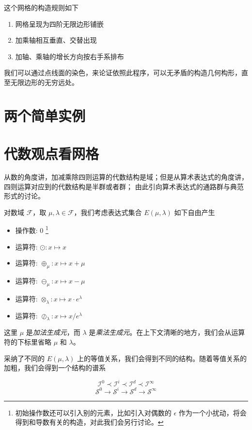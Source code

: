 \documentclass[a4paper,12pt]{article}
\numberwithin{definition}{section}
\numberwithin{lemma}{section}
\numberwithin{proposition}{section}
\numberwithin{theorem}{section}
\numberwithin{grammar}{section}
\numberwithin{program}{section}
\numberwithin{convention}{section}
\numberwithin{corollary}{section}
\begin{document}
这个网格的构造规则如下
\begin{enumerate}
    \item 网格呈现为四阶无限边形铺嵌
    \item 加乘轴相互垂直、交替出现
    \item 加轴、乘轴的增长方向按右手系排布
\end{enumerate}

我们可以通过点线面的染色，来论证依照此程序，可以无矛盾的构造几何构形，直至无限边形的无穷远处。

\newpage

\section{两个简单实例}

\newpage

\section{代数观点看网格}

从数的角度讲，加减乘除四则运算的代数结构是域；但是从算术表达式的角度讲，四则运算对应到的代数结构是半群或者群；
由此引向算术表达式的通路群与典范形式的讨论。

对数域 $\mathcal{F}$，取 $\mu, \lambda \in \mathcal{F}$，我们考虑表达式集合 $E(\mu, \lambda)$ 如下自由产生
\begin{itemize}
    \item 操作数: $0$ \footnote[1]{初始操作数还可以引入别的元素，比如引入对偶数的 $\epsilon$ 作为一个小扰动，将会得到和导数有关的构造，对此我们会另行讨论。}
    \item 运算符: $\odot: x \mapsto x$
    \item 运算符: $\oplus_\mu: x \mapsto x + \mu$
    \item 运算符: $\ominus_\mu: x \mapsto x - \mu$
    \item 运算符: $\otimes_\lambda: x \mapsto x \cdot e^\lambda$
    \item 运算符: $\oslash_\lambda: x \mapsto x / e^\lambda$
\end{itemize}

这里 $\mu$ 是\emph{加法生成元}，而 $\lambda$ 是\emph{乘法生成元}。在上下文清晰的地方，我们会从运算符的下标里省略 $\mu$ 和 $\lambda$。

采纳了不同的 $E(\mu, \lambda)$ 上的等值关系，我们会得到不同的结构。随着等值关系的加粗，我们会得到一个结构的谱系

$$
  \mathcal{I}^0 \prec \mathcal{I}^i \prec \mathcal{I}^d \prec \mathcal{I}^\infty
$$
$$
  \mathcal{S}^0 \to \mathcal{S}^i \to \mathcal{S}^d \to \mathcal{S}^\infty
$$
\end{document}
